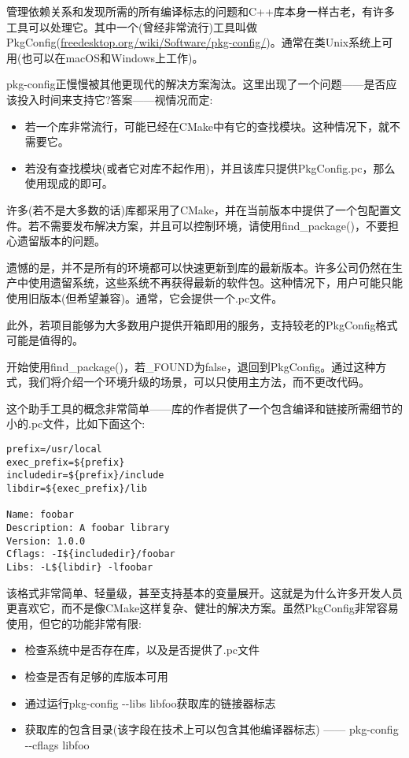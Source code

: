管理依赖关系和发现所需的所有编译标志的问题和C++库本身一样古老，有许多工具可以处理它。其中一个(曾经非常流行)工具叫做PkgConfig(\url{freedesktop.org/wiki/Software/pkg-config/})。通常在类Unix系统上可用(也可以在macOS和Windows上工作)。

pkg-config正慢慢被其他更现代的解决方案淘汰。这里出现了一个问题——是否应该投入时间来支持它?答案——视情况而定:

\begin{itemize}
\item 
若一个库非常流行，可能已经在CMake中有它的查找模块。这种情况下，就不需要它。

\item 
若没有查找模块(或者它对库不起作用)，并且该库只提供PkgConfig.pc，那么使用现成的即可。
\end{itemize}

许多(若不是大多数的话)库都采用了CMake，并在当前版本中提供了一个包配置文件。若不需要发布解决方案，并且可以控制环境，请使用find\_package()，不要担心遗留版本的问题。

遗憾的是，并不是所有的环境都可以快速更新到库的最新版本。许多公司仍然在生产中使用遗留系统，这些系统不再获得最新的软件包。这种情况下，用户可能只能使用旧版本(但希望兼容)。通常，它会提供一个.pc文件。

此外，若项目能够为大多数用户提供开箱即用的服务，支持较老的PkgConfig格式可能是值得的。

开始使用find\_package()，若\_FOUND为false，退回到PkgConfig。通过这种方式，我们将介绍一个环境升级的场景，可以只使用主方法，而不更改代码。

这个助手工具的概念非常简单——库的作者提供了一个包含编译和链接所需细节的小的.pc文件，比如下面这个:

\begin{lstlisting}[style=styleCMake]
prefix=/usr/local
exec_prefix=${prefix}
includedir=${prefix}/include
libdir=${exec_prefix}/lib

Name: foobar
Description: A foobar library
Version: 1.0.0
Cflags: -I${includedir}/foobar
Libs: -L${libdir} -lfoobar
\end{lstlisting}

该格式非常简单、轻量级，甚至支持基本的变量展开。这就是为什么许多开发人员更喜欢它，而不是像CMake这样复杂、健壮的解决方案。虽然PkgConfig非常容易使用，但它的功能非常有限:

\begin{itemize}
\item 
检查系统中是否存在库，以及是否提供了.pc文件

\item 
检查是否有足够的库版本可用

\item 
通过运行pkg-config -{}-libs libfoo获取库的链接器标志

\item 
获取库的包含目录(该字段在技术上可以包含其他编译器标志) ——  pkg-config -{}-cflags libfoo
\end{itemize}

